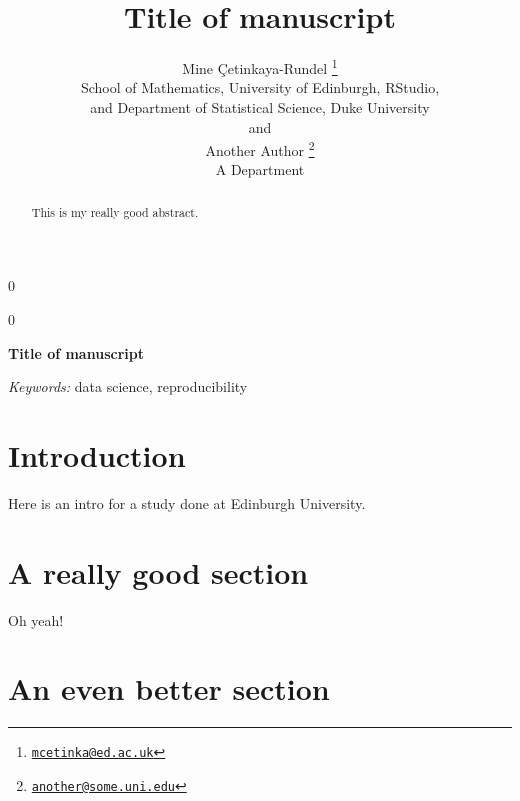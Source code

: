 \documentclass[12pt]{article}
\newcommand{\blind}{0}
\newcommand{\school}[1]{Edinburgh University}
\begin{document}
\def\spacingset#1{\renewcommand{\baselinestretch}%
{#1}\small\normalsize} \spacingset{1}



\blind
{
  \title{\bf Title of manuscript}

  \author{
        Mine \c{C}etinkaya-Rundel \footnote{\href{mailto:mcetinka@ed.ac.uk}{\nolinkurl{mcetinka@ed.ac.uk}}} \\
    School of Mathematics, University of Edinburgh, RStudio,\\
and Department of Statistical Science, Duke University\\
     and \\     Another Author \footnote{\href{mailto:another@some.uni.edu}{\nolinkurl{another@some.uni.edu}}} \\
    A Department\\
      }
  \maketitle
} \fi

\blind
{
  \bigskip
  \bigskip
  \bigskip
  \begin{center}
    {\LARGE\bf Title of manuscript}
  \end{center}
  \medskip
} \fi

\bigskip
\begin{abstract}
This is my really good abstract.
\end{abstract}

\noindent%
{\it Keywords:} data science, reproducibility
\vfill

\newpage
\spacingset{1.45} %

\hypertarget{introduction}{%
\section{Introduction}\label{introduction}}

Here is an intro for a study done at \school{}.

\hypertarget{a-really-good-section}{%
\section{A really good section}\label{a-really-good-section}}

Oh yeah! \citep{cetinkaya-rundel2018}

\hypertarget{an-even-better-section}{%
\section{An even better section}\label{an-even-better-section}}
\end{document}
